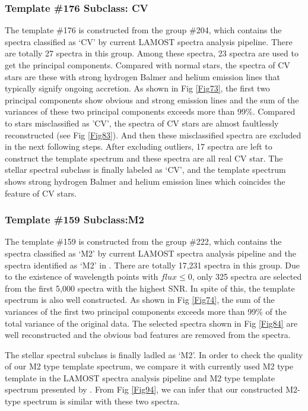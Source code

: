 \documentclass[manuscript]{aastex}
\begin{document}
\subsubsection{Template \#176 Subclass: CV}
The template \#176 is constructed from the group \#204,
which contains the spectra classified as `CV' by current LAMOST spectra analysis pipeline.
There are totally 27 spectra in this group.
Among these spectra, 23 spectra are used to get the principal components.
Compared with normal stars, the spectra of CV stars are these with strong hydrogen Balmer and helium emission lines that typically signify ongoing accretion.
As shown in Fig \ref{Fig73}, the first two principal components show obvious and strong emission lines and the sum of the variances of these two  principal components  exceeds more than 99\%.
Compared to stars misclassified as 'CV', the spectra of CV stars are almost faultlessly reconstructed (see Fig \ref{Fig83}).
And then these misclassified spectra are excluded in the next following steps.
After excluding outliers, 17 spectra are left to construct the template spectrum and these spectra are all real CV star.
The stellar spectral subclass is finally labeled as `CV',
and the template spectrum shows strong hydrogen Balmer and helium emission lines which coincides the feature of CV stars.



\subsubsection{Template \#159  Subclass:M2}
The template \#159 is constructed from the group \#222,
which contains the spectra classified as `M2' by current LAMOST spectra analysis pipeline and the spectra identified as `M2' in \cite{yi2013m}.
There are totally 17,231 spectra in this group.
Due to the existence of wavelength points with $flux\le0$, only 325 spectra are selected from the first 5,000 spectra with the highest SNR.
In spite of this, the template spectrum is also well constructed.
As shown in Fig \ref{Fig74}, the sum of the variances of the first two principal components  exceeds more than 99\% of the total variance of the original data.
The selected spectra shown in Fig \ref{Fig84} are  well reconstructed and the obvious bad features are removed from the spectra.



The stellar spectral subclass is finally ladled as `M2'.
In order to check the quality of our M2 type template spectrum,
we compare it with currently used M2 type template in the LAMOST spectra analysis pipeline and
M2 type template spectrum presented by \citet{bochanski2007low}.
From Fig \ref{Fig94}, we can infer that our constructed M2-type spectrum is similar with these two spectra.
\end{document}
